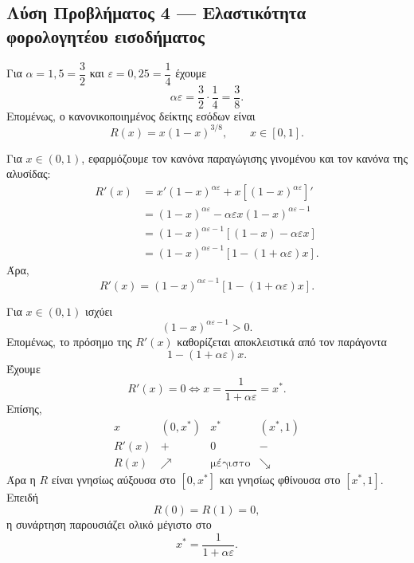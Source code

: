 \subsection*{Λύση Προβλήματος 4 --- Ελαστικότητα φορολογητέου εισοδήματος}

\begin{alist}
  \item Για $\alpha=1{,}5=\dfrac32$ και
        $\varepsilon=0{,}25=\dfrac14$ έχουμε
        \[
          \alpha\varepsilon
          =\frac32\cdot\frac14
          =\frac38.
        \]
        Επομένως, ο κανονικοποιημένος δείκτης εσόδων είναι
        \[
          {R(x)=x(1-x)^{3/8}},
          \qquad x\in[0,1].
        \]

  \item Για $x\in(0,1)$, εφαρμόζουμε τον κανόνα παραγώγισης γινομένου
        και τον κανόνα της αλυσίδας:
        \begin{align*}
          R'(x)
          &=x'(1-x)^{\alpha\varepsilon}
            +x\left[(1-x)^{\alpha\varepsilon}\right]'\\
          &=(1-x)^{\alpha\varepsilon}
            -\alpha\varepsilon x
             (1-x)^{\alpha\varepsilon-1}\\
          &=(1-x)^{\alpha\varepsilon-1}
            \left[(1-x)-\alpha\varepsilon x\right]\\
          &=(1-x)^{\alpha\varepsilon-1}
            \left[1-(1+\alpha\varepsilon)x\right].
        \end{align*}
        Άρα,
        \[
          {
          R'(x)=(1-x)^{\alpha\varepsilon-1}
          \left[1-(1+\alpha\varepsilon)x\right]}.
        \]

  \item Για $x\in(0,1)$ ισχύει
        \[
          (1-x)^{\alpha\varepsilon-1}>0.
        \]
        Επομένως, το πρόσημο της $R'(x)$ καθορίζεται αποκλειστικά από
        τον παράγοντα
        \[
          1-(1+\alpha\varepsilon)x.
        \]
        Έχουμε
        \[
          R'(x)=0
          \Longleftrightarrow
          x=\frac{1}{1+\alpha\varepsilon}=x^*.
        \]
        Επίσης,
        \[
        \begin{array}{c|ccc}
          x & (0,x^*) & x^* & (x^*,1)\\ \hline
          R'(x) & + & 0 & -\\
          R(x) & \nearrow & \text{μέγιστο} & \searrow
        \end{array}
        \]
        Άρα η $R$ είναι γνησίως αύξουσα στο $[0,x^*]$ και γνησίως
        φθίνουσα στο $[x^*,1]$. Επειδή
        \[
          R(0)=R(1)=0,
        \]
        η συνάρτηση παρουσιάζει ολικό μέγιστο στο
        \[
          {x^*=\frac{1}{1+\alpha\varepsilon}}.
        \]


\end{alist}
